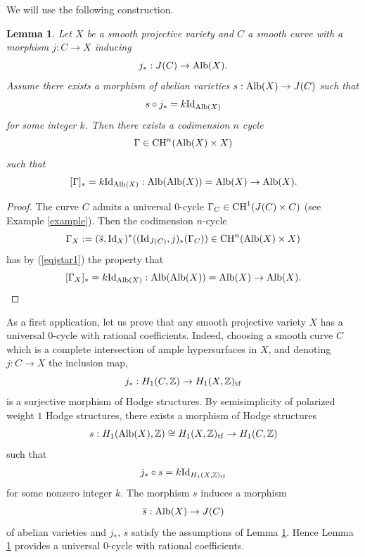 \documentclass[10pt]{article}
\newtheorem{lemm}[theo]{Lemma}
\begin{document}
We will use the following construction.
\begin{lemm} \label{lerefsuggestion} Let $X$ be  a smooth projective variety and $C$ a smooth curve with a morphism
$j: C\rightarrow X$ inducing
$$j_*:J(C)\rightarrow {\rm Alb}(X).$$
Assume there exists a morphism of abelian varieties $s:{\rm Alb}(X)\rightarrow J(C)$ such that
\begin{eqnarray} \label{eqjstar1}s\circ j_*= k{\rm Id}_{{\rm Alb}(X)}\end{eqnarray} for some integer $k$. Then there exists a codimension $n$ cycle
$$\Gamma\in{\rm CH}^n({\rm Alb}(X)\times X)$$
such that
$$[\Gamma]_*=k{\rm Id}_{{\rm Alb}(X)}:{\rm Alb}({\rm Alb}(X))={\rm Alb}(X)\rightarrow {\rm Alb}(X).$$
\end{lemm}
\begin{proof}
The curve $C$ admits a universal $0$-cycle $\Gamma_C\in {\rm CH}^1(J(C)\times C)$ (see Example \ref{example}). Then
the codimension $n$-cycle
$$\Gamma_X:=(\overline{s},{\rm Id}_X)^*(({\rm Id}_{J(C)},j)_*(\Gamma_C))\in{\rm CH}^n({\rm Alb}(X)\times X)$$
 has by (\ref{eqjstar1}) the property that
$$ [\Gamma_X]_*=k {\rm Id}_{{\rm Alb}(X)}:{\rm Alb}({\rm Alb}(X))={\rm Alb}(X)\rightarrow {\rm Alb}(X).$$
\end{proof}
As a first application, let us prove that any smooth projective variety $X$ has a universal $0$-cycle with rational coefficients. Indeed, choosing a smooth  curve $C$ which is a complete intersection of ample hypersurfaces in $X$, and denoting $j: C\rightarrow X$ the inclusion map,
$$j_*:H_1(C,\mathbb{Z})\rightarrow H_1(X,\mathbb{Z})_{\rm tf}$$
is a surjective morphism of Hodge structures. By semisimplicity of polarized weight $1$ Hodge structures,
there exists a morphism of Hodge structures
$$ s: H_1({\rm Alb}(X),\mathbb{Z})\cong  H_1(X,\mathbb{Z})_{\rm tf}\rightarrow H_1(C,\mathbb{Z})$$
such that \begin{eqnarray} \label{eqjstar} j_*\circ s=k{\rm Id}_{H_1(X,\mathbb{Z})_{\rm tf}}\end{eqnarray}
for some nonzero integer $k$. The morphism $s$ induces a morphism
$$\overline{s}: {\rm Alb}(X)\rightarrow J(C)$$
of abelian varieties and $j_*,\,\overline{s}$ satisfy the assumptions of Lemma \ref{lerefsuggestion}. Hence Lemma
 \ref{lerefsuggestion} provides a universal $0$-cycle with rational coefficients.
\end{document}
